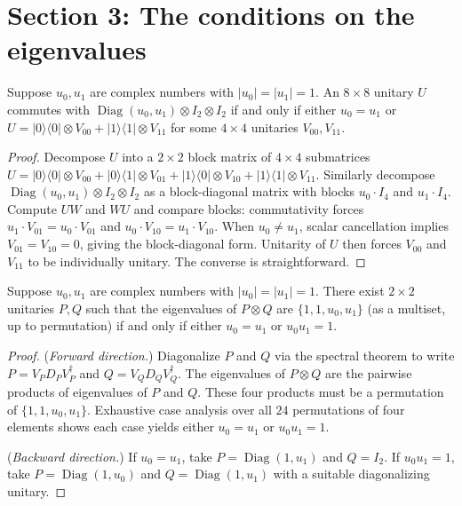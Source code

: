 \section{Section 3: The conditions on the eigenvalues}

\begin{lemma}
  \label{lem:s3_1}
  \leanok
  Suppose $u_0, u_1$ are complex numbers with $|u_0| = |u_1| = 1$.
  An $8 \times 8$ unitary $U$ commutes with
  $\operatorname{Diag}(u_0, u_1) \otimes I_2 \otimes I_2$
  if and only if either $u_0 = u_1$ or
  $U = |0\rangle\langle 0| \otimes V_{00} + |1\rangle\langle 1| \otimes V_{11}$
  for some $4 \times 4$ unitaries $V_{00}, V_{11}$.
\end{lemma}

\begin{proof}
  \leanok
  Decompose $U$ into a $2 \times 2$ block matrix of $4 \times 4$ submatrices
  $U = |0\rangle\langle 0| \otimes V_{00}
     + |0\rangle\langle 1| \otimes V_{01}
     + |1\rangle\langle 0| \otimes V_{10}
     + |1\rangle\langle 1| \otimes V_{11}$.
  Similarly decompose $\operatorname{Diag}(u_0, u_1) \otimes I_2 \otimes I_2$
  as a block-diagonal matrix with blocks $u_0 \cdot I_4$ and $u_1 \cdot I_4$.
  Compute $UW$ and $WU$ and compare blocks:
  commutativity forces $u_1 \cdot V_{01} = u_0 \cdot V_{01}$
  and $u_0 \cdot V_{10} = u_1 \cdot V_{10}$.
  When $u_0 \neq u_1$, scalar cancellation implies $V_{01} = V_{10} = 0$,
  giving the block-diagonal form.
  Unitarity of $U$ then forces $V_{00}$ and $V_{11}$ to be individually unitary.
  The converse is straightforward.
\end{proof}

\begin{lemma}
  \label{lem:s3_2}
  \leanok
  Suppose $u_0, u_1$ are complex numbers with $|u_0| = |u_1| = 1$.
  There exist $2 \times 2$ unitaries $P, Q$ such that the eigenvalues
  of $P \otimes Q$ are $\{1, 1, u_0, u_1\}$ (as a multiset, up to permutation)
  if and only if either $u_0 = u_1$ or $u_0 u_1 = 1$.
\end{lemma}

\begin{proof}
  \leanok
  (\emph{Forward direction.})
  Diagonalize $P$ and $Q$ via the spectral theorem
  to write $P = V_P D_P V_P^\dagger$ and $Q = V_Q D_Q V_Q^\dagger$.
  The eigenvalues of $P \otimes Q$ are the pairwise products
  of eigenvalues of $P$ and $Q$.
  These four products must be a permutation of $\{1, 1, u_0, u_1\}$.
  Exhaustive case analysis over all $24$ permutations of four elements
  shows each case yields either $u_0 = u_1$ or $u_0 u_1 = 1$.

  (\emph{Backward direction.})
  If $u_0 = u_1$, take $P = \operatorname{Diag}(1, u_1)$ and $Q = I_2$.
  If $u_0 u_1 = 1$, take $P = \operatorname{Diag}(1, u_0)$
  and $Q = \operatorname{Diag}(1, u_1)$
  with a suitable diagonalizing unitary.
\end{proof}


